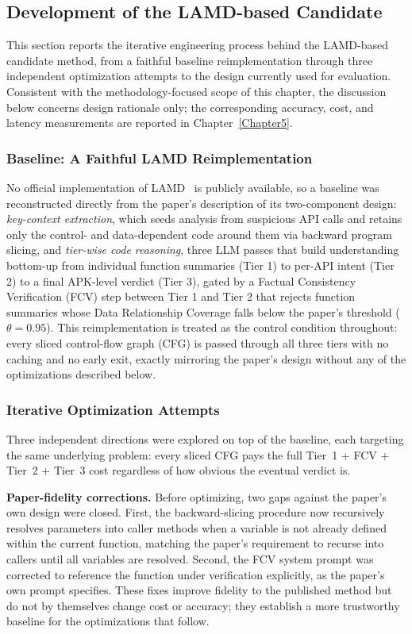 \subsection{Development of the LAMD-based Candidate}\label{sec:lamd-candidate}

This section reports the iterative engineering process behind the LAMD-based
candidate method, from a faithful baseline reimplementation through three
independent optimization attempts to the design currently used for
evaluation. Consistent with the methodology-focused scope of this chapter,
the discussion below concerns design rationale only; the corresponding
accuracy, cost, and latency measurements are reported in
Chapter~\ref{Chapter5}.

\subsubsection{Baseline: A Faithful LAMD Reimplementation}

No official implementation of LAMD~\cite{Qian2025-ua} is publicly available,
so a baseline was reconstructed directly from the paper's description of its
two-component design: \emph{key-context extraction}, which seeds analysis
from suspicious API calls and retains only the control- and data-dependent
code around them via backward program slicing, and \emph{tier-wise code
reasoning}, three LLM passes that build understanding bottom-up from
individual function summaries (Tier 1) to per-API intent (Tier 2) to a final
APK-level verdict (Tier 3), gated by a Factual Consistency Verification (FCV)
step between Tier 1 and Tier 2 that rejects function summaries whose Data
Relationship Coverage falls below the paper's threshold ($\theta = 0.95$).
This reimplementation is treated as the control condition throughout: every
sliced control-flow graph (CFG) is passed through all three tiers with no
caching and no early exit, exactly mirroring the paper's design without any
of the optimizations described below.

\subsubsection{Iterative Optimization Attempts}

Three independent directions were explored on top of the baseline, each
targeting the same underlying problem: every sliced CFG pays the full
Tier~1 + FCV + Tier~2 + Tier~3 cost regardless of how obvious the eventual
verdict is.

\textbf{Paper-fidelity corrections.} Before optimizing, two gaps against the
paper's own design were closed. First, the backward-slicing procedure now
recursively resolves parameters into caller methods when a variable is not
already defined within the current function, matching the paper's
requirement to recurse into callers until all variables are resolved.
Second, the FCV system prompt was corrected to reference the function under
verification explicitly, as the paper's own prompt specifies. These fixes
improve fidelity to the published method but do not by themselves change
cost or accuracy; they establish a more trustworthy baseline for the
optimizations that follow.

